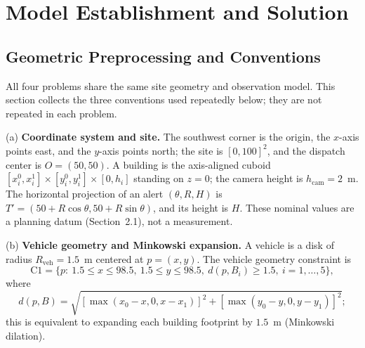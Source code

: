 \section{Model Establishment and Solution}
\label{sec:model}

\subsection{Geometric Preprocessing and Conventions}

All four problems share the same site geometry and observation model. This section collects the three conventions used repeatedly below; they are not repeated in each problem.

\noindent (a) \textbf{Coordinate system and site.} The southwest corner is the origin, the $x$-axis points east, and the $y$-axis points north; the site is $[0,100]^2$, and the dispatch center is $O=(50,50)$. A building is the axis-aligned cuboid $[x_i^0,x_i^1]\times[y_i^0,y_i^1]\times[0,h_i]$ standing on $z=0$; the camera height is $h_{\mathrm{cam}}=2$~m. The horizontal projection of an alert $(\theta,R,H)$ is $T'=(50+R\cos\theta,50+R\sin\theta)$, and its height is $H$. These nominal values are a planning datum (Section~2.1), not a measurement.

\noindent (b) \textbf{Vehicle geometry and Minkowski expansion.} A vehicle is a disk of radius $R_{\mathrm{veh}}=1.5$~m centered at $p=(x,y)$. The vehicle geometry constraint is
\begin{equation}
  \mathrm{C1}=\{p:\ 1.5\le x\le98.5,\ 1.5\le y\le98.5,\ d(p,B_i)\ge1.5,\ i=1,\dots,5\},
\end{equation}
where
\begin{equation}
  d(p,B)=\sqrt{[\max(x_0-x,0,x-x_1)]^2+[\max(y_0-y,0,y-y_1)]^2};
\end{equation}
this is equivalent to expanding each building footprint by $1.5$~m (Minkowski dilation).

